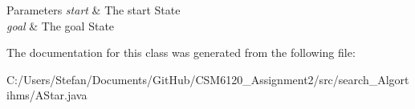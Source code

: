\begin{DoxyParams}{Parameters}
{\em start} & The start State \\
\hline
{\em goal} & The goal State \\
\hline
\end{DoxyParams}


The documentation for this class was generated from the following file\+:\begin{DoxyCompactItemize}
\item 
C\+:/\+Users/\+Stefan/\+Documents/\+Git\+Hub/\+C\+S\+M6120\+\_\+\+Assignment2/src/search\+\_\+\+Algortihms/A\+Star.\+java\end{DoxyCompactItemize}
